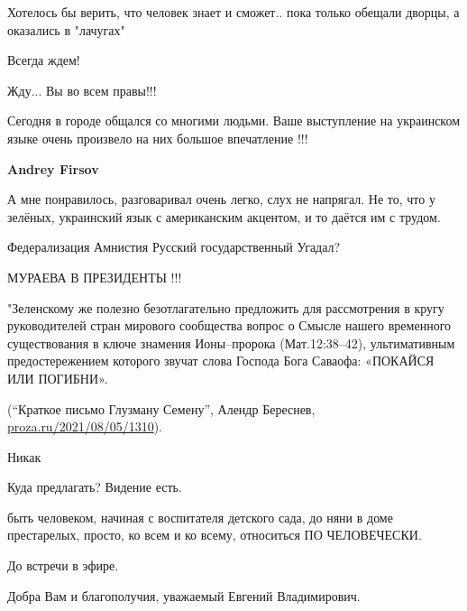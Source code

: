 \begin{itemize}

Хотелось бы верить, что человек знает и сможет.. пока только обещали дворцы, а
оказались в "лачугах"

Всегда ждем!


Жду... Вы во всем правы!!!


Сегодня в городе общался со многими людьми. Ваше выступление на украинском
языке очень произвело на них большое впечатление !!!

\begin{itemize} %
\textbf{Andrey Firsov} 

А мне понравилось, разговаривал очень легко, слух не напрягал. Не то, что у
зелёных, украинский язык с американским акцентом, и то даётся им с трудом.

\end{itemize} %

Федерализация
Амнистия
Русский государственный
Угадал?

МУРАЕВА В ПРЕЗИДЕНТЫ !!!


"Зеленскому же полезно безотлагательно предложить для рассмотрения в кругу
руководителей стран мирового сообщества вопрос о Смысле нашего временного
существования в ключе знамения Ионы–пророка (Мат.12:38–42), ультимативным
предостережением которого звучат слова Господа Бога Саваофа: «ПОКАЙСЯ ИЛИ
ПОГИБНИ».

(\enquote{Краткое письмо Глузману Семену}, Алендр Береснев, \url{proza.ru/2021/08/05/1310}).

Никак

Куда предлагать? Видение есть.


быть человеком, начиная с воспитателя детского сада, до няни в доме
престарелых, просто, ко всем и ко всему, относиться ПО ЧЕЛОВЕЧЕСКИ.

До встречи в эфире.


Добра Вам и благополучия, уважаемый Евгений Владимирович.



\end{itemize}
